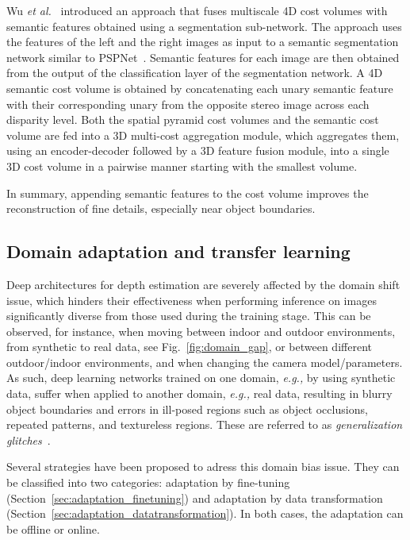\documentclass[10pt,journal,compsoc]{IEEEtran}
\newcommand{\eg}{\emph{e.g., }}
\newcommand{\etal}{\emph{et al.}}
\begin{document}
Wu \etal~\cite{Wu_2019_ICCV} introduced an approach that fuses multiscale 4D cost volumes with semantic features obtained using a segmentation sub-network. The approach uses the features of the left and the right images  as input to a semantic segmentation network similar to PSPNet~\cite{zhao2017pyramid}.  Semantic features for each image are then obtained from the output of the classification layer of the segmentation network. A 4D semantic cost volume is  obtained by concatenating each unary semantic feature with their corresponding unary from the opposite stereo image across each disparity level. Both the spatial pyramid cost volumes and the semantic cost volume are fed into a 3D multi-cost aggregation module, which aggregates  them, using an encoder-decoder followed by a 3D feature fusion module,  into a single 3D cost volume in a pairwise manner starting with the smallest volume. 

			


In summary, appending  semantic features to the  cost volume  improves the reconstruction of fine details, especially near object boundaries.



\subsection{Domain adaptation and transfer learning}
\label{sec:domain_adaptation}

Deep architectures for depth estimation are severely affected by the domain shift issue, which hinders their effectiveness when performing inference on images significantly diverse from those used during the training stage. This can be observed, for instance, when moving between indoor and outdoor environments, from synthetic to real data, see Fig.~\ref{fig:domain_gap}, or between different outdoor/indoor environments,  and when changing the camera model/parameters.  As such, deep learning networks trained on one domain, \eg by using synthetic data, suffer when applied to another domain, \eg real data, resulting in blurry object boundaries and errors in ill-posed regions such as object occlusions, repeated patterns, and textureless regions. These are referred to as \emph{generalization glitches}~\cite{pang2018zoom}.


Several strategies have been  proposed to adress this domain bias issue.  They can be classified into two  categories: adaptation by fine-tuning (Section~\ref{sec:adaptation_finetuning}) and adaptation by data transformation (Section~\ref{sec:adaptation_datatransformation}). In both cases, the adaptation can be offline or online.  
\end{document}

